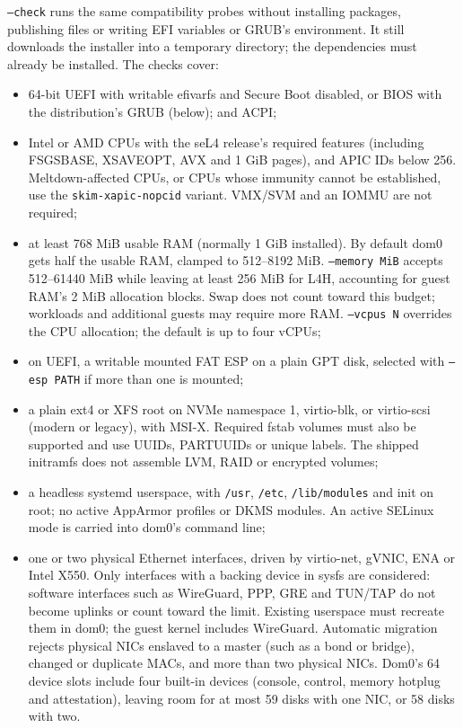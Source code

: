 \documentclass[11pt,a4paper]{report}
\newcommand{\file}[1]{\texttt{#1}}
\begin{document}
\texttt{--check} runs the same compatibility probes without installing
packages, publishing files or writing EFI variables or GRUB's
environment. It still downloads
the installer into a temporary directory; the dependencies must already
be installed. The checks cover:
\begin{itemize}
  \item 64-bit UEFI with writable efivarfs and Secure Boot disabled, or
        BIOS with the distribution's GRUB (below); and ACPI;
  \item Intel or AMD CPUs with the seL4 release's required features
        (including FSGSBASE, XSAVEOPT, AVX and 1 GiB pages), and APIC IDs
        below 256. Meltdown-affected CPUs, or CPUs whose immunity cannot
        be established, use the \texttt{skim-xapic-nopcid} variant.
        VMX/SVM and an IOMMU are not required;
  \item at least 768 MiB usable RAM (normally 1 GiB installed). By default
        dom0 gets half the usable RAM, clamped to 512--8192 MiB.
        \texttt{--memory MiB} accepts 512--61440 MiB while leaving at least
        256 MiB for L4H, accounting for guest RAM's 2 MiB allocation blocks.
        Swap does not count toward this budget; workloads and additional
        guests may require more RAM. \texttt{--vcpus N} overrides the CPU
        allocation; the default is up to four vCPUs;
  \item on UEFI, a writable mounted FAT ESP on a plain GPT disk, selected
        with \texttt{--esp PATH} if more than one is mounted;
  \item a plain ext4 or XFS root on NVMe namespace 1, virtio-blk, or
        virtio-scsi (modern or legacy), with MSI-X. Required fstab volumes must also be
        supported and use UUIDs, PARTUUIDs or unique labels. The shipped
        initramfs does not assemble LVM, RAID or encrypted volumes;
  \item a headless systemd userspace, with \file{/usr}, \file{/etc},
        \file{/lib/modules} and init on root; no active AppArmor profiles
        or DKMS modules. An active SELinux mode is carried into dom0's
        command line;
  \item one or two physical Ethernet interfaces, driven by virtio-net,
        gVNIC, ENA or Intel X550. Only interfaces with a backing device in
        sysfs are considered: software interfaces such as WireGuard, PPP,
        GRE and TUN/TAP do not become uplinks or count toward the limit.
        Existing userspace must recreate them in dom0; the guest kernel
        includes WireGuard. Automatic migration rejects physical NICs
        enslaved to a master (such as a bond or bridge), changed or duplicate
        MACs, and more than two physical NICs.
        Dom0's 64 device slots include four built-in devices (console,
        control, memory hotplug and attestation), leaving room for at most
        59 disks with one NIC, or 58 disks with two.
\end{itemize}
\end{document}
